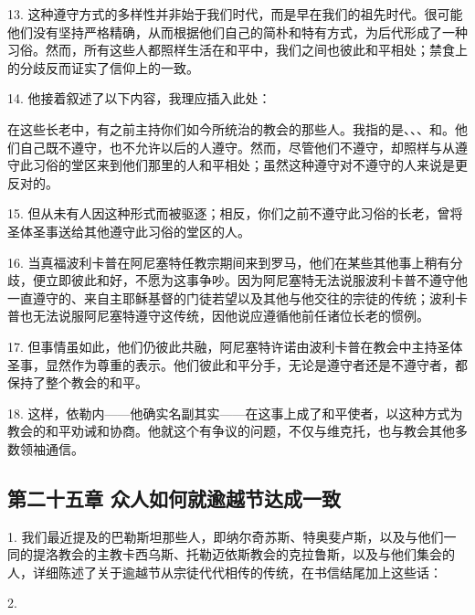 13. 这种遵守方式的多样性并非始于我们时代，而是早在我们的祖先时代。很可能他们没有坚持严格精确，从而根据他们自己的简朴和特有方式，为后代形成了一种习俗。然而，所有这些人都照样生活在和平中，我们之间也彼此和平相处；禁食上的分歧反而证实了信仰上的一致。\par

14. 他接着叙述了以下内容，我理应插入此处：\par

在这些长老中，有之前主持你们如今所统治的教会的那些人。我指的是、、、和。他们自己既不遵守，也不允许以后的人遵守。然而，尽管他们不遵守，却照样与从遵守此习俗的堂区来到他们那里的人和平相处；虽然这种遵守对不遵守的人来说是更反对的。\par

15. 但从未有人因这种形式而被驱逐；相反，你们之前不遵守此习俗的长老，曾将圣体圣事送给其他遵守此习俗的堂区的人。\par

16. 当真福波利卡普在阿尼塞特任教宗期间来到罗马，他们在某些其他事上稍有分歧，便立即彼此和好，不愿为这事争吵。因为阿尼塞特无法说服波利卡普不遵守他一直遵守的、来自主耶稣基督的门徒若望以及其他与他交往的宗徒的传统；波利卡普也无法说服阿尼塞特遵守这传统，因他说应遵循他前任诸位长老的惯例。\par

17. 但事情虽如此，他们仍彼此共融，阿尼塞特许诺由波利卡普在教会中主持圣体圣事，显然作为尊重的表示。他们彼此和平分手，无论是遵守者还是不遵守者，都保持了整个教会的和平。\par

18. 这样，依勒内——他确实名副其实——在这事上成了和平使者，以这种方式为教会的和平劝诫和协商。他就这个有争议的问题，不仅与维克托，也与教会其他多数领袖通信。\par


\subsection{第二十五章  众人如何就逾越节达成一致}

1. 我们最近提及的巴勒斯坦那些人，即纳尔奇苏斯、特奥斐卢斯，以及与他们一同的提洛教会的主教卡西乌斯、托勒迈依斯教会的克拉鲁斯，以及与他们集会的人，详细陈述了关于逾越节从宗徒代代相传的传统，在书信结尾加上这些话：\par

2. \par

